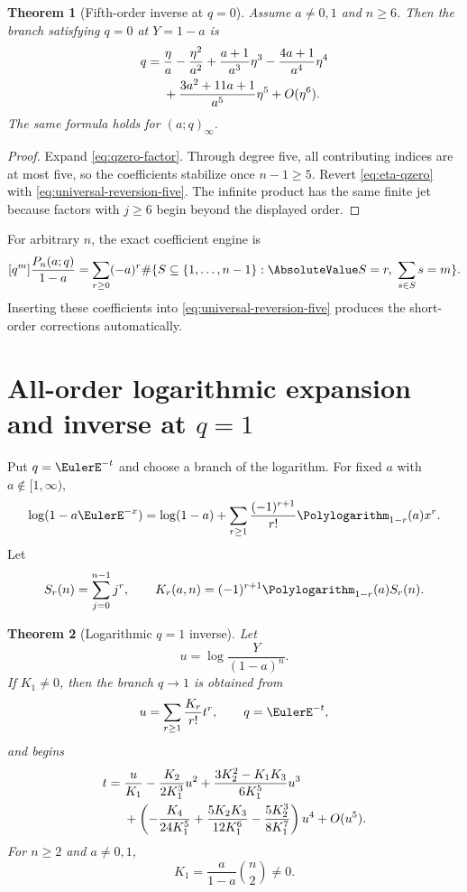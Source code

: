 \documentclass[11pt,a4paper,oneside,openany]{book}
\newtheorem{theorem}{Theorem}[chapter]
\theoremstyle{definition}
\theoremstyle{remark}
\begin{document}
\begin{theorem}[Fifth-order inverse at \(q=0\)]\label{thm:finite-qzero-inverse}
Assume \(a\ne0,1\) and \(n\ge6\).  Then the branch satisfying \(q=0\) at
\(Y=1-a\) is
\begin{align}
 q={}&\frac{\eta}{a}-\frac{\eta^2}{a^2}
 +\frac{a+1}{a^3}\eta^3-\frac{4a+1}{a^4}\eta^4\notag\\
 &+\frac{3a^2+11a+1}{a^5}\eta^5+O(\eta^6).
\label{eq:finite-qzero-inverse}
\end{align}
The same formula holds for \((a;q)_\infty\).
\end{theorem}

\begin{proof}
Expand \eqref{eq:qzero-factor}.  Through degree five, all contributing
indices are at most five, so the coefficients stabilize once \(n-1\ge5\).
Revert \eqref{eq:eta-qzero} with
\eqref{eq:universal-reversion-five}.  The infinite product has the same
finite jet because factors with \(j\ge6\) begin beyond the displayed order.
\end{proof}

For arbitrary \(n\), the exact coefficient engine is
\begin{equation}\label{eq:qzero-subset-coeff}
 [q^m]\frac{P_n(a;q)}{1-a}
 =\sum_{r\ge0}(-a)^r
 \#\{S\subseteq\{1,\ldots,n-1\}:\AbsoluteValue S=r,\ \sum_{s\in S}s=m\}.
\end{equation}
Inserting these coefficients into \eqref{eq:universal-reversion-five}
produces the short-order corrections automatically.

\section{All-order logarithmic expansion and inverse at \texorpdfstring{$q=1$}{q=1}}

Put \(q=\EulerE^{-t}\) and choose a branch of the logarithm.  For fixed \(a\)
with \(a\notin[1,\infty)\),
\begin{equation}\label{eq:single-factor-taylor}
 \log(1-a\EulerE^{-x})
 =\log(1-a)+\sum_{r\ge1}\frac{(-1)^{r+1}}{r!}
 \Polylogarithm_{1-r}(a)x^r.
\end{equation}
Let
\[
 S_r(n)=\sum_{j=0}^{n-1}j^r,
 \qquad
 K_r(a,n)=(-1)^{r+1}\Polylogarithm_{1-r}(a)S_r(n).
\]

\begin{theorem}[Logarithmic \(q=1\) inverse]\label{thm:finite-qone-inverse}
Let
\[
 u=\log\frac{Y}{(1-a)^n}.
\]
If \(K_1\ne0\), then the branch \(q\to1\) is obtained from
\begin{equation}\label{eq:t-u-allorders}
 u=\sum_{r\ge1}\frac{K_r}{r!}t^r,
 \qquad q=\EulerE^{-t},
\end{equation}
and begins
\begin{align}
 t={}&\frac{u}{K_1}-\frac{K_2}{2K_1^3}u^2
 +\frac{3K_2^2-K_1K_3}{6K_1^5}u^3\notag\\
 &+\left(-\frac{K_4}{24K_1^5}
 +\frac{5K_2K_3}{12K_1^6}
 -\frac{5K_2^3}{8K_1^7}\right)u^4+O(u^5).
\label{eq:finite-qone-t-inverse}
\end{align}
For \(n\ge2\) and \(a\ne0,1\),
\[
 K_1=\frac{a}{1-a}\binom n2\ne0.
\]
\end{theorem}
\end{document}

